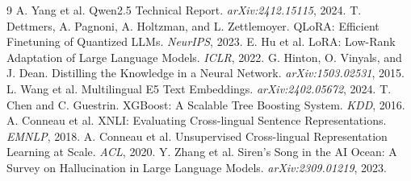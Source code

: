 \documentclass[11pt]{article}
\begin{document}
\begin{thebibliography}{9}
 A. Yang et al. Qwen2.5 Technical Report. \emph{arXiv:2412.15115}, 2024.
 T. Dettmers, A. Pagnoni, A. Holtzman, and L. Zettlemoyer. QLoRA:
Efficient Finetuning of Quantized LLMs. \emph{NeurIPS}, 2023.
 E. Hu et al. LoRA: Low-Rank Adaptation of Large Language Models.
\emph{ICLR}, 2022.
 G. Hinton, O. Vinyals, and J. Dean. Distilling the Knowledge in a
Neural Network. \emph{arXiv:1503.02531}, 2015.
 L. Wang et al. Multilingual E5 Text Embeddings.
\emph{arXiv:2402.05672}, 2024.
 T. Chen and C. Guestrin. XGBoost: A Scalable Tree Boosting System.
\emph{KDD}, 2016.
 A. Conneau et al. XNLI: Evaluating Cross-lingual Sentence
Representations. \emph{EMNLP}, 2018.
 A. Conneau et al. Unsupervised Cross-lingual Representation Learning
at Scale. \emph{ACL}, 2020.
 Y. Zhang et al. Siren's Song in the AI Ocean: A Survey on Hallucination
in Large Language Models. \emph{arXiv:2309.01219}, 2023.
\end{thebibliography}
\end{document}
